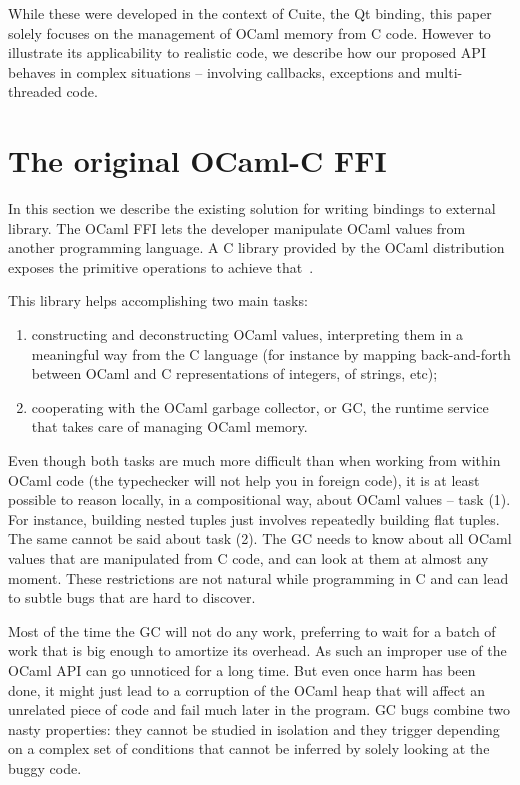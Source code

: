 \documentclass[a4paper]{easychair}
\begin{document}
While these were developed in the context of Cuite, the Qt binding, this
paper solely focuses on the management of OCaml memory from C code.
However to illustrate its applicability to realistic code, we describe
how our proposed API behaves in complex situations -- involving
callbacks, exceptions and multi-threaded code.

\section{The original OCaml-C FFI}

In this section we describe the existing solution for writing bindings to
external library.  The OCaml FFI lets the developer manipulate OCaml values
from another programming language. A C library provided by the OCaml
distribution exposes the primitive operations to achieve that~\citep{harmony}.

This library helps accomplishing two main tasks:

\begin{enumerate}
\item constructing and deconstructing OCaml values, interpreting them in a
      meaningful way from the C language (for instance by mapping
      back-and-forth between OCaml and C representations of integers, of
      strings, etc);
\item cooperating with the OCaml garbage collector, or GC, the runtime
      service that takes care of managing OCaml memory.
\end{enumerate}

Even though both tasks are much more difficult than when working from
within OCaml code (the typechecker will not help you in foreign code),
it is at least possible to reason locally, in a compositional way, about
OCaml values -- task (1). For instance, building nested tuples just
involves repeatedly building flat tuples.
The same cannot be said about task (2). The GC needs to know about all
OCaml values that are manipulated from C code, and can look at them at
almost any moment. These restrictions are not natural while programming
in C and can lead to subtle bugs that are hard to discover.

Most of the time the GC will not do any work, preferring to wait for a
batch of work that is big enough to amortize its overhead. As such an
improper use of the OCaml API can go unnoticed for a long time. But even
once harm has been done, it might just lead to a corruption of the OCaml
heap that will affect an unrelated piece of code and fail much later in the
program.  GC bugs combine two nasty properties: they cannot be studied in
isolation and they trigger depending on a complex set of conditions that
cannot be inferred by solely looking at the buggy code.
\end{document}
